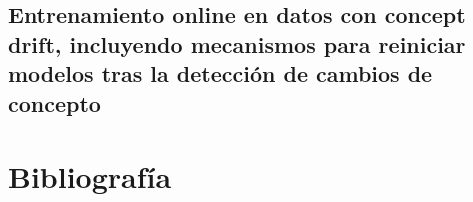 \subsection{Entrenamiento online en datos con concept drift, incluyendo mecanismos para reiniciar modelos tras la detección de cambios de concepto}




\newpage
\section{Bibliografía}




